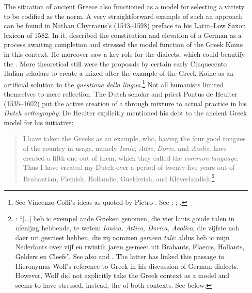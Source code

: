 The situation of ancient Greece also functioned as a model for selecting a variety to be codified as the  norm. A very straightforward example of such an approach can be found in Nathan Chytraeus’s (1543–1598) preface to his Latin–Low Saxon lexicon of 1582. In it, \citet[\textsc{a.3}\textsc{\textsuperscript{r}}\textsc{–a.3}\textsc{\textsuperscript{v}}]{Chytraeus1582} described the constitution and elevation of a German  as a process awaiting completion and stressed the model function of the Greek Koine in this context. He moreover saw a key role for the dialects, which could beautify the . More theoretical still were the proposals by certain early Cinquecento Italian scholars to create a mixed  after the example of the Greek Koine as an artificial solution to the \textit{questione della lingua}.\footnote{See Vincenzo Colli’s ideas as quoted by Pietro \citet[\textsc{xii}\textsc{\textsuperscript{v}}\textsc{–xiii}\textsc{\textsuperscript{r}}]{Bembo1525}. See \citet[119]{Melzi1966}; \citet[215--218]{Trovato1984}; \citet[12]{Trapp1990}.} Not all humanists limited themselves to mere reflection. The Dutch scholar and priest Pontus de Heuiter (1535–1602) put the active creation of a   through mixture to actual practice in his \textit{Dutch orthography}. De Heuiter explicitly mentioned his debt to the ancient Greek model for his initiative:

\begin{quote}
I have taken the Greeks as an example, who, having the four good tongues of the country in usage, namely \textit{Ionic}, \textit{Attic}, \textit{Doric}, and \textit{Aeolic}, have created a fifth one out of them, which they called the \textit{common language}. Thus I have created my Dutch over a period of twenty-five years out of Brabantian, Flemish, Hollandic, Guelderish, and Kleverlandish.\footnote{: “[…] heb ic exempel ande Grieken genomen, die vier lants goude talen in ufenijng hebbende, te weten: \textit{Ionica, Attica, Dorica, Aeolica}, die vijfste noh daer uit gesmeet hebben, die zij nommen \textit{gemeen tale}: aldus heb ic mijn Nederlants over vijf en twintih jaren gesmeet uit Brabants, Flaems, Hollants, Gelders en Cleefs”. See also \citet[110]{Dibbets2008} and \citet[13--14]{De1917}. The latter has linked this passage to Hieronymus Wolf’s reference to Greek in his discussion of German dialects. However, Wolf did not explicitly take the Greek context as a model and seems to have stressed, instead, the  of both contexts. See  below.}
\end{quote}

